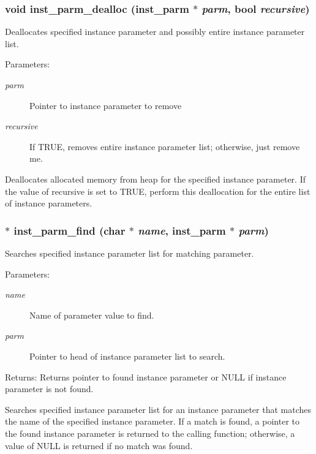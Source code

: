 \subsubsection{\setlength{\rightskip}{0pt plus 5cm}void inst\_\-parm\_\-dealloc ({\bf inst\_\-parm} $\ast$ {\em parm}, {\bf bool} {\em recursive})}\label{param_8h_a13}


Deallocates specified instance parameter and possibly entire instance parameter list.

\begin{Desc}
\item[Parameters:]
\begin{description}
\item[{\em parm}]Pointer to instance parameter to remove \item[{\em recursive}]If TRUE, removes entire instance parameter list; otherwise, just remove me.\end{description}
\end{Desc}
Deallocates allocated memory from heap for the specified instance parameter. If the value of recursive is set to TRUE, perform this deallocation for the entire list of instance parameters. 
\subsubsection{$\ast$ inst\_\-parm\_\-find (char $\ast$ {\em name}, {\bf inst\_\-parm} $\ast$ {\em parm})}\label{param_8h_a4}


Searches specified instance parameter list for matching parameter.

\begin{Desc}
\item[Parameters:]
\begin{description}
\item[{\em name}]Name of parameter value to find. \item[{\em parm}]Pointer to head of instance parameter list to search.\end{description}
\end{Desc}
\begin{Desc}
\item[Returns:]Returns pointer to found instance parameter or NULL if instance parameter is not found.\end{Desc}
Searches specified instance parameter list for an instance parameter that matches the name of the specified instance parameter. If a match is found, a pointer to the found instance parameter is returned to the calling function; otherwise, a value of NULL is returned if no match was found. 
